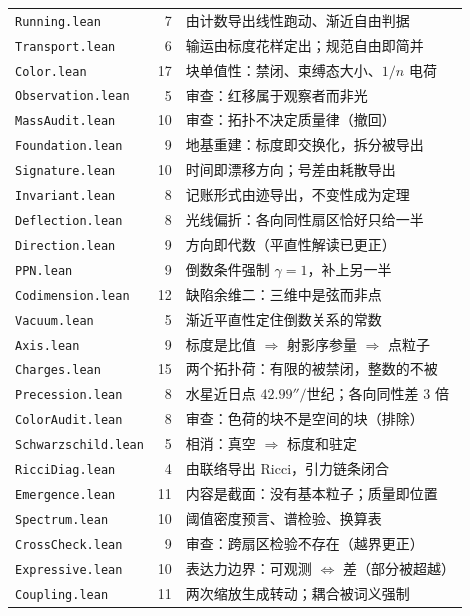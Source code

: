\documentclass[11pt,a4paper]{article}
\theoremstyle{sudef}
\begin{document}
\begin{center}
\begin{longtable}{lrl}
\texttt{Running.lean}     &  7 & 由计数导出线性跑动、渐近自由判据 \\
\texttt{Transport.lean}   &  6 & 输运由标度花样定出；规范自由即简并 \\
\texttt{Color.lean}       & 17 & 块单值性：禁闭、束缚态大小、$1/n$ 电荷 \\
\texttt{Observation.lean} &  5 & 审查：红移属于观察者而非光 \\
\texttt{MassAudit.lean}   & 10 & 审查：拓扑不决定质量律（撤回） \\
\texttt{Foundation.lean}  &  9 & 地基重建：标度即交换化，拆分被导出 \\
\texttt{Signature.lean}   & 10 & 时间即漂移方向；号差由耗散导出 \\
\texttt{Invariant.lean}   &  8 & 记账形式由迹导出，不变性成为定理 \\
\texttt{Deflection.lean}  &  8 & 光线偏折：各向同性扇区恰好只给一半 \\
\texttt{Direction.lean}   &  9 & 方向即代数（平直性解读已更正） \\
\texttt{PPN.lean}         &  9 & 倒数条件强制 $\gamma=1$，补上另一半 \\
\texttt{Codimension.lean} & 12 & 缺陷余维二：三维中是弦而非点 \\
\texttt{Vacuum.lean}      &  5 & 渐近平直性定住倒数关系的常数 \\
\texttt{Axis.lean}        &  9 & 标度是比值 $\Rightarrow$ 射影序参量 $\Rightarrow$ 点粒子 \\
\texttt{Charges.lean}     & 15 & 两个拓扑荷：有限的被禁闭，整数的不被 \\
\texttt{Precession.lean}  &  8 & 水星近日点 $42.99''/$世纪；各向同性差 3 倍 \\
\texttt{ColorAudit.lean}  &  8 & 审查：色荷的块不是空间的块（排除） \\
\texttt{Schwarzschild.lean} & 5 & 相消：真空 $\Rightarrow$ 标度和驻定 \\
\texttt{RicciDiag.lean}  &  4 & 由联络导出 Ricci，引力链条闭合 \\
\texttt{Emergence.lean}  & 11 & 内容是截面：没有基本粒子；质量即位置 \\
\texttt{Spectrum.lean}   & 10 & 阈值密度预言、谱检验、换算表 \\
\texttt{CrossCheck.lean} &  9 & 审查：跨扇区检验不存在（越界更正） \\
\texttt{Expressive.lean} & 10 & 表达力边界：可观测 $\iff$ 差（部分被超越） \\
\texttt{Coupling.lean}   & 11 & 两次缩放生成转动；耦合被词义强制 \\

\end{longtable}
\end{center}
\end{document}
